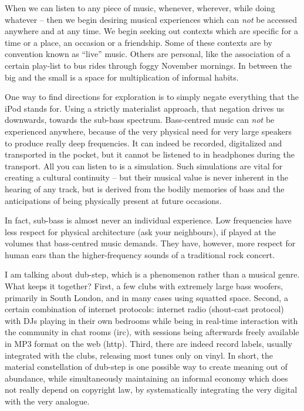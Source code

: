 When we can listen to any piece of music, whenever, wherever, while doing
whatever – then we begin desiring musical experiences which can \textit{not} be
accessed anywhere and at any time. We begin seeking out contexts which are
specif\hbox{}ic for a time or a place, an occasion or a friendship. Some of
these contexts are by convention known as ``live'' music. Others are personal,
like the association of a certain play-list to bus rides through foggy November
mornings. In between the big and the small is a space for multiplication of
informal habits.

One way to f\hbox{}ind directions for exploration is to simply negate everything
that the iPod stands for. Using a strictly materialist approach, that negation
drives us downwards, towards the sub-bass spectrum. Bass-centred music can
\textit{not} be experienced anywhere, because of the very physical need for very
large speakers to produce really deep frequencies. It can indeed be recorded,
digitalized and transported in the pocket, but it cannot be listened to in
headphones during the transport. All you can listen to is a simulation. Such
simulations are vital for creating a cultural continuity – but their musical
value is never inherent in the hearing of any track, but is derived from the
bodily memories of bass and the anticipations of being physically present at
future occasions.

In fact, sub-bass is almost never an individual experience. Low frequencies have
less respect for physical architecture (ask your neighbours), if played at the
volumes that bass-centred music demands. They have, however, more respect for
human ears than the higher-frequency sounds of a traditional rock concert.

I am talking about dub-step, which is a phenomenon rather than a musical genre.
What keeps it together? F\hbox{}irst, a few clubs with extremely large bass
woofers, primarily in South London, and in many cases using squatted space.
Second, a certain combination of internet protocols: internet radio (shout-cast
protocol) with DJs playing in their own bedrooms while being in real-time
interaction with the community in chat rooms (irc), with sessions being
afterwards freely available in MP3 format on the web (http). Third, there are
indeed record labels, usually integrated with the clubs, releasing most tunes
only on vinyl.  In short, the material constellation of dub-step is one possible
way to create meaning out of abundance, while simultaneously maintaining an
informal economy which does not really depend on copyright law, by
systematically integrating the very digital with the very analogue.


